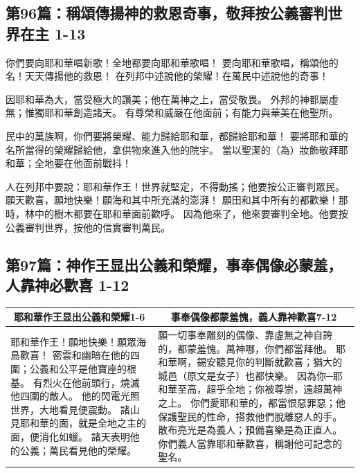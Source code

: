 \subsection{第96篇：稱頌傳揚神的救恩奇事，敬拜按公義審判世界在主 1-13}
你們要向耶和華唱新歌！全地都要向耶和華歌唱！
要向耶和華歌唱，稱頌他的名！天天傳揚他的救恩！
在列邦中述說他的榮耀！在萬民中述說他的奇事！

因耶和華為大，當受極大的讚美；他在萬神之上，當受敬畏。
外邦的神都屬虛無；惟獨耶和華創造諸天。
有尊榮和威嚴在他面前；有能力與華美在他聖所。

民中的萬族啊，你們要將榮耀、能力歸給耶和華，都歸給耶和華！
要將耶和華的名所當得的榮耀歸給他，拿供物來進入他的院宇。
當以聖潔的（為）妝飾敬拜耶和華；全地要在他面前戰抖！

人在列邦中要說：耶和華作王！世界就堅定，不得動搖；他要按公正審判眾民。
願天歡喜，願地快樂！願海和其中所充滿的澎湃！
願田和其中所有的都歡樂！那時，林中的樹木都要在耶和華面前歡呼。
因為他來了，他來要審判全地。他要按公義審判世界，按他的信實審判萬民。

\subsection{第97篇：神作王显出公義和榮耀，事奉偶像必蒙羞，人靠神必歡喜 1-12}
\begin{table}[H]
\centering
\begin{tabular}{p{7.25cm}|p{10cm}}\hline\hline
\multicolumn{1}{c|}{耶和華作王显出公義和榮耀1-6}&\multicolumn{1}{c}{事奉偶像都蒙羞愧，義人靠神歡喜7-12}\\\hline
耶和華作王！願地快樂！願眾海島歡喜！
密雲和幽暗在他的四圍；公義和公平是他寶座的根基。
有烈火在他前頭行，燒滅他四圍的敵人。
他的閃電光照世界，大地看見便震動。
諸山見耶和華的面，就是全地之主的面，便消化如蠟。
諸天表明他的公義；萬民看見他的榮耀。
&願一切事奉雕刻的偶像、靠虛無之神自誇的，都蒙羞愧。萬神哪，你們都當拜他。
耶和華啊，錫安聽見你的判斷就歡喜；猶大的城邑（原文是女子）也都快樂。
因為你─耶和華至高，超乎全地；你被尊崇，遠超萬神之上。
你們愛耶和華的，都當恨惡罪惡；他保護聖民的性命，搭救他們脫離惡人的手。
散布亮光是為義人；預備喜樂是為正直人。
你們義人當靠耶和華歡喜，稱謝他可記念的聖名。\\\hline
\end{tabular}
\end{table} 




